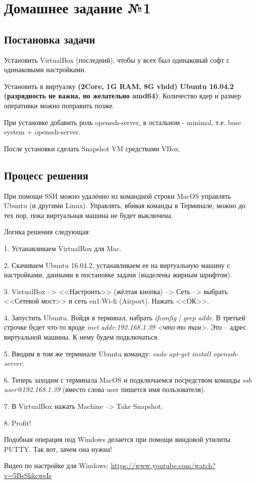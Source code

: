 \documentclass[a4paper, 14pt]{article}
\author{}
\title{}
\date{}  %
\begin{document}
	\pagestyle{plain} %
	
	\newpage
	
	\section*{Домашнее задание №1}
	
	\subsection*{Постановка задачи}
	
	Установить VirtualBox (последний), чтобы у всех был одинаковый софт с одинаковыми настройками.
	
	Установить в виртуалку \textbf{(2Core, 1G RAM, 8G vhdd) Ubuntu 16.04.2 (разрядность не важна, но желательно amd64)}. Количество ядер и размер оперативки можно поправить позже.

При установке добавить роль openssh-server, в остальном - minimal, т.е. base system + openssh-server.

После установки сделать Snapshot VM средствами VBox.
	
	\subsection*{Процесс решения}
	
	При помощи SSH можно удалённо из командной строки MacOS управлять Ubuntu (и другими Linux). Управлять, вбивая команды в Терминале, можно до тех пор, пока виртуальная машина не будет выключена.
	
	\vspace{1.5cm}
	
	Логика решения следующая:
	
	1. Устанавливаем VirtualBox для Mac.
	
	2. Скачиваем Ubuntu 16.04.2, устанавливаем ее на виртуальную машину с настройками, данными в постановке задачи (выделены жирным шрифтом).
	
	3. VirtualBox --> <<Настроить>> (жёлтая кнопка) --> Сеть --> выбрать <<Сетевой мост>> и сеть en1:Wi-fi (Airport). Нажать <<ОК>>.
	
	4. Запустить Ubuntu. Войдя в терминал, набрать \textit{ifconfig | grep addr}. В третьей строчке будет что-то вроде \textit{inet addr:192.168.1.39 <что-то там>}. Это -- адрес виртуальной машины. К нему будем подключаться.
	
	5. Вводим в том же терминале Ubuntu команду: \textit{sudo apt-get install openssh-server}.
	
	6. Теперь заходим с терминала MacOS и подключаемся посредством команды \textit{ssh user@192.168.1.39} (вместо слова user пишется имя пользователя).
	
	7. В VirtualBox нажать Machine --> Take Snapshot. 
	
	8. Profit!
	
	\vspace{1.5cm}
	
	Подобная операция под Windows делается при помощи виндовой утилиты PUTTY. Так вот, зачем она нужна!
	
	Видео по настройке для Windows: \href{https://www.youtube.com/watch?v=5BsShkcweIs}{https://www.youtube.com/watch?v=5BsShkcweIs}
\end{document}
